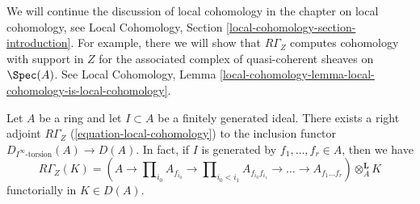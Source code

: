 \medskip\noindent
We will continue the discussion of local cohomology in
the chapter on local cohomology, see
Local Cohomology, Section \ref{local-cohomology-section-introduction}.
For example, there we will show that $R\Gamma_Z$ computes cohomology
with support in $Z$ for the associated complex of quasi-coherent sheaves
on $\Spec(A)$. See Local Cohomology, Lemma
\ref{local-cohomology-lemma-local-cohomology-is-local-cohomology}.


\begin{lemma}
\label{lemma-local-cohomology-adjoint}
Let $A$ be a ring and let $I \subset A$ be a finitely generated ideal.
There exists a right adjoint $R\Gamma_Z$ (\ref{equation-local-cohomology})
to the inclusion functor $D_{I^\infty\text{-torsion}}(A) \to D(A)$.
In fact, if $I$ is generated by $f_1, \ldots, f_r \in A$, then we have
$$
R\Gamma_Z(K) =
(A \to \prod\nolimits_{i_0} A_{f_{i_0}} \to
\prod\nolimits_{i_0 < i_1} A_{f_{i_0}f_{i_1}}
\to \ldots \to A_{f_1\ldots f_r}) \otimes_A^\mathbf{L} K
$$
functorially in $K \in D(A)$.
\end{lemma}

